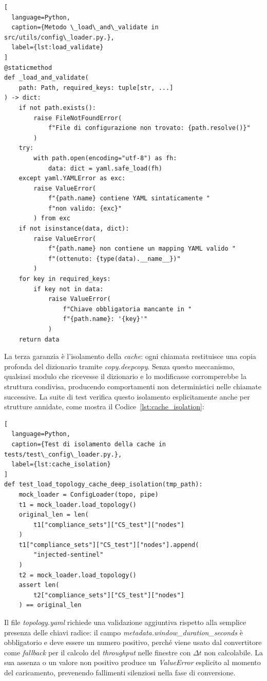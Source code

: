 \begin{lstlisting}[
  language=Python,
  caption={Metodo \_load\_and\_validate in src/utils/config\_loader.py.},
  label={lst:load_validate}
]
@staticmethod
def _load_and_validate(
    path: Path, required_keys: tuple[str, ...]
) -> dict:
    if not path.exists():
        raise FileNotFoundError(
            f"File di configurazione non trovato: {path.resolve()}"
        )
    try:
        with path.open(encoding="utf-8") as fh:
            data: dict = yaml.safe_load(fh)
    except yaml.YAMLError as exc:
        raise ValueError(
            f"{path.name} contiene YAML sintaticamente "
            f"non valido: {exc}"
        ) from exc
    if not isinstance(data, dict):
        raise ValueError(
            f"{path.name} non contiene un mapping YAML valido "
            f"(ottenuto: {type(data).__name__})"
        )
    for key in required_keys:
        if key not in data:
            raise ValueError(
                f"Chiave obbligatoria mancante in "
                f"{path.name}: '{key}'"
            )
    return data
\end{lstlisting}

La terza garanzia è l'isolamento della \textit{cache}: ogni chiamata restituisce una
copia profonda del dizionario tramite \textit{copy.deepcopy}. Senza questo meccanismo, qualsiasi
modulo che ricevesse il dizionario e lo modificasse corromperebbe la struttura condivisa,
producendo comportamenti non deterministici nelle chiamate successive. La suite di test verifica
questo isolamento esplicitamente anche per strutture annidate, come mostra il Codice~\ref{lst:cache_isolation}:

\begin{lstlisting}[
  language=Python,
  caption={Test di isolamento della cache in tests/test\_config\_loader.py.},
  label={lst:cache_isolation}
]
def test_load_topology_cache_deep_isolation(tmp_path):
    mock_loader = ConfigLoader(topo, pipe)
    t1 = mock_loader.load_topology()
    original_len = len(
        t1["compliance_sets"]["CS_test"]["nodes"]
    )
    t1["compliance_sets"]["CS_test"]["nodes"].append(
        "injected-sentinel"
    )
    t2 = mock_loader.load_topology()
    assert len(
        t2["compliance_sets"]["CS_test"]["nodes"]
    ) == original_len
\end{lstlisting}

Il file \textit{topology.yaml} richiede una validazione aggiuntiva rispetto alla semplice
presenza delle chiavi radice: il campo \textit{metadata.window\_duration\_seconds} è obbligatorio
e deve essere un numero positivo, perché viene usato dal convertitore come \textit{fallback}
per il calcolo del \textit{throughput} nelle finestre con $\Delta t$ non calcolabile. La
sua assenza o un valore non positivo produce un \textit{ValueError} esplicito al momento del
caricamento, prevenendo fallimenti silenziosi nella fase di conversione.

